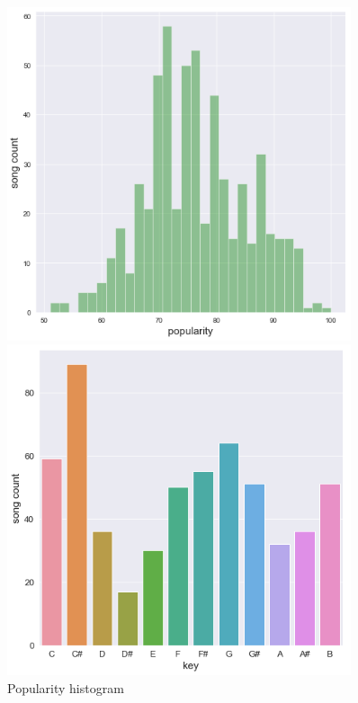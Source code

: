 \begin{figure}[h]
    \centering
    \begin{minipage}{0.45\textwidth}
        \centering
        \includegraphics[width=0.9\textwidth]{methodology/fig/histogram.PNG} %
        \caption{Popularity histogram}
        \label{fig:histo}
    \end{minipage}\hfill
    \begin{minipage}{0.45\textwidth}
        \centering
        \includegraphics[width=0.9\textwidth]{methodology/fig/keycount.PNG} %

\end{minipage}
\end{figure}
